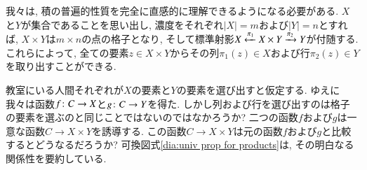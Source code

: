 \begin{example}\label{ex:grid2}


我々は, 積の普遍的性質を完全に直感的に理解できるようになる必要がある. $X$と$Y$が集合であることを思い出し, 濃度をそれぞれ$|X|=m$および$|Y|=n$とすれば, $X\times Y$は$m\times n$の点の格子となり, そして標準射影$X\xleftarrow{\pi_1}X\times Y\xrightarrow{\pi_2}Y$が付随する. これらによって, 全ての要素$z\in X\times Y$からその列$\pi_1(z)\in X$および行$\pi_2(z)\in Y$を取り出すことができる.


教室にいる人間それぞれが$X$の要素と$Y$の要素を選び出すと仮定する. ゆえに我々は函数$f\colon C\rightarrow X$と$g\colon C\rightarrow Y$を得た. しかし列および行を選び出すのは格子の要素を選ぶのと同じことではないのではなかろうか? 二つの函数$f$および$g$は一意な函数$C\to X\times Y$を誘導する. この函数$C\to X\times Y$は元の函数$f$および$g$と比較するとどうなるだろうか? 可換図式\eqref{dia:univ prop for products}は, その明白なる関係性を要約している.

\end{example}

